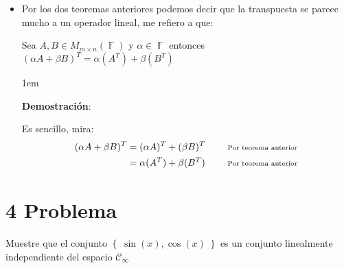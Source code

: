 \documentclass[12pt, fleqn]{article}                             %
\newenvironment{SmallIndentation}[1][0.75em]                    %
        {\begin{adjustwidth}{#1}{}\begin{footnotesize}}             %
        {\end{footnotesize}\end{adjustwidth}}                       %
\DeclareMathOperator \Space {\quad}                             %
\newcommand \Remember[1]{\Space\text{\scriptsize{#1}}}          %
\theoremstyle{break}                                            %
\DeclareMathOperator \GenericField {\mathbb{F}}                 %
\newcommand{\Set}[1]    {\left\{ \; #1 \; \right\}}             %
\newcommand{\Wrap}[1]    {\left( #1 \right)}                    %
\newcommand{\Cos}[1] {\cos\Wrap{#1}}                            %
\newcommand{\Sin}[1] {\sin\Wrap{#1}}                            %
\begin{document}
\begin{itemize}
\begin{SmallIndentation}[1em]
            \end{SmallIndentation}

        \item
            Por los dos teoremas anteriores podemos decir que la transpuesta se parece mucho a 
            un operador lineal, me refiero a que:

            Sea $A,B \in M_{m \times n}(\GenericField)$ y $\alpha \in \GenericField$ entonces 
            $(\alpha A + \beta B)^T = \alpha(A^T) + \beta(B^T)$

            \begin{SmallIndentation}[1em]
                \textbf{Demostración}:
                
                Es sencillo, mira:
                \begin{align*}
                    (\alpha A + \beta B)^T
                        &= (\alpha A)^T + (\beta B)^T
                            && \Remember{Por teorema anterior} \\
                        &= \alpha (A^T) + \beta (B^T)
                            && \Remember{Por teorema anterior}
                \end{align*}
            
            \end{SmallIndentation}
                

    \end{itemize}





\clearpage
\section{4 Problema}

    Muestre que el conjunto $\Set{\Sin{x},\Cos{x}}$ es un conjunto linealmente
    independiente del espacio $\mathcal{C}_\infty$
\end{document}
